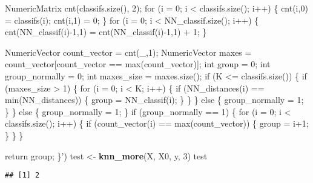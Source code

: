 \documentclass[]{article}
\newenvironment{Shaded}{\begin{snugshade}}{\end{snugshade}}
\newcommand{\DecValTok}[1]{\textcolor[rgb]{0.00,0.00,0.81}{#1}}
\newcommand{\KeywordTok}[1]{\textcolor[rgb]{0.13,0.29,0.53}{\textbf{#1}}}
\newcommand{\NormalTok}[1]{#1}
\newcommand{\StringTok}[1]{\textcolor[rgb]{0.31,0.60,0.02}{#1}}
\begin{document}
\begin{Shaded}
\begin{Highlighting}[]
\StringTok{    NumericMatrix cnt(classifs.size(), 2);}
\StringTok{    for (i = 0; i < classifs.size(); i++) \{}
\StringTok{      cnt(i,0) = classifs(i);}
\StringTok{      cnt(i,1) = 0;}
\StringTok{    \}}
\StringTok{    for (i = 0; i < NN_classif.size(); i++) \{}
\StringTok{      cnt(NN_classif(i)-1,1) = cnt(NN_classif(i)-1,1) + 1;}
\StringTok{    \}}

\StringTok{    NumericVector count_vector = cnt(_,1);}
\StringTok{    NumericVector maxes = count_vector[count_vector == max(count_vector)];}
\StringTok{    int group = 0;}
\StringTok{    int group_normally = 0;}
\StringTok{    int maxes_size = maxes.size();}
\StringTok{    if (K <= classifs.size()) \{}
\StringTok{      if (maxes_size > 1) \{}
\StringTok{        for (i = 0; i < K; i++) \{}
\StringTok{          if (NN_distances(i) == min(NN_distances)) \{}
\StringTok{            group = NN_classif(i);}
\StringTok{          \}}
\StringTok{        \}}
\StringTok{      \} else \{}
\StringTok{        group_normally = 1;}
\StringTok{      \}}
\StringTok{    \} else \{}
\StringTok{      group_normally = 1;}
\StringTok{    \}}
\StringTok{    }
\StringTok{    if (group_normally == 1) \{}
\StringTok{      for (i = 0; i < classifs.size(); i++) \{}
\StringTok{        if (count_vector(i) == max(count_vector)) \{}
\StringTok{          group = i+1;}
\StringTok{        \}}
\StringTok{      \}}
\StringTok{    \}}

\StringTok{  return group;}
\StringTok{\}'}\NormalTok{)}
\NormalTok{test <-}\StringTok{ }\KeywordTok{knn_more}\NormalTok{(X, X0, y, }\DecValTok{3}\NormalTok{)}
\NormalTok{test}
\end{Highlighting}
\end{Shaded}

\begin{verbatim}
## [1] 2
\end{verbatim}
\end{document}

